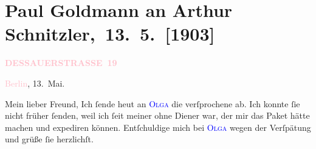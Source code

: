 

\renewcommand{\erwaehntePersonen}{Personen: Otto Brahm, Felix Paul Greve, Alfred de Musset, Olga Schnitzler, Oscar Wilde}
\renewcommand{\erwaehnteInstitutionen}{Institutionen: Deutsches Theater Berlin, J. C. C. Bruns}
\renewcommand{\erwaehnteOrte}{Orte: Berlin, Dessauer Straße, Frankfurt am Main, Minden, Schauspielhaus Frankfurt am Main, Wien}
\renewcommand{\erwaehnteWerke}{Werke: Berliner Theater. (»Der Schleier der Beatrice« von Arthur Schnitzler.), Der Schleier der Beatrice. Schauspiel in fünf Akten, Fingerzeige, Man soll nichts verschwören. Komödie}
\section[ Paul Goldmann an Arthur Schnitzler, 13. 5. {[}1903{]}]{Paul Goldmann an Arthur Schnitzler, 13. 5. {[}1903{]}}
\nopagebreak{}
\rehead{ }\normalsize\beginnumbering{}
\toendnotes[C]{\smallbreak\pagebreak[2]}
\toendnotes[C]{\smallbreak}
\pstart
           \noindent{}\raggedleft{}{\pb}\textcolor{gray}{\textbf{\textcolor{pink}{DESSAUERSTRASSE 19}{}\ledrightnote{\textcolor{pink}{Dessauer Straße}}}}\pend
           
\pstart
           \textcolor{pink}{Berlin}{}\ledrightnote{\textcolor{pink}{Berlin}}, 13. Mai.\pend
           
\pstart\center{}Mein lieber Freund,\pend
\pstart
           Ich ſende heut an \textsc{\textcolor{blue}{Olga}{}\ledrightnote{\textcolor{blue}{Olga Schnitzler}}} die verſprochene \label{K_L03372-1v}\label{K_L03372-1h} ab. Ich konnte ſie nicht
               früher ſenden, weil ich ſeit meiner \label{K_L03372-2v}\label{K_L03372-2h} ohne Diener war, der \strikeout{\textcolor{gray}{×}\textcolor{gray}{it}} mir das Paket hätte machen und expediren können. Entſchuldige mich bei \textsc{\textcolor{blue}{Olga}{}\ledrightnote{\textcolor{blue}{Olga Schnitzler}}} wegen der Verſpätung und grüße ſie herzlichſt.\pend
           

